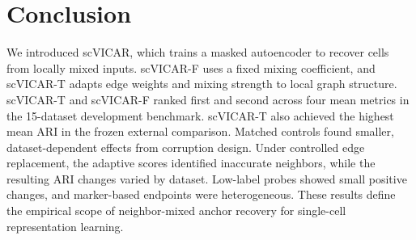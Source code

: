 \section{Conclusion}
\label{sec:conclusion}

We introduced scVICAR, which trains a masked autoencoder to recover cells from
locally mixed inputs. scVICAR-F uses a fixed mixing coefficient, and scVICAR-T
adapts edge weights and mixing strength to local graph structure. scVICAR-T
and scVICAR-F ranked first and second across four mean metrics in the
15-dataset development benchmark. scVICAR-T also achieved the highest mean ARI in the
frozen external comparison. Matched controls found smaller,
dataset-dependent effects from corruption design. Under controlled edge
replacement, the adaptive scores identified inaccurate neighbors, while the
resulting ARI changes varied by dataset. Low-label probes showed small positive
changes, and marker-based endpoints were heterogeneous. These results define
the empirical scope of neighbor-mixed anchor recovery for single-cell
representation learning.
